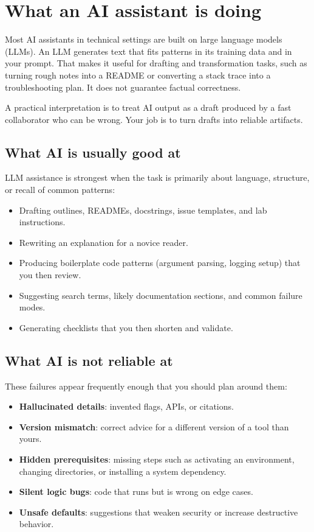 \section{What an AI assistant is doing}
Most AI assistants in technical settings are built on large language models (LLMs). An LLM generates text that fits patterns in its training data and in your prompt. That makes it useful for drafting and transformation tasks, such as turning rough notes into a README or converting a stack trace into a troubleshooting plan. It does not guarantee factual correctness.

A practical interpretation is to treat AI output as a draft produced by a fast collaborator who can be wrong. Your job is to turn drafts into reliable artifacts.

\subsection{What AI is usually good at}
LLM assistance is strongest when the task is primarily about language, structure, or recall of common patterns:
\begin{itemize}[noitemsep]
  \item Drafting outlines, READMEs, docstrings, issue templates, and lab instructions.
  \item Rewriting an explanation for a novice reader.
  \item Producing boilerplate code patterns (argument parsing, logging setup) that you then review.
  \item Suggesting search terms, likely documentation sections, and common failure modes.
  \item Generating checklists that you then shorten and validate.
\end{itemize}

\subsection{What AI is not reliable at}
These failures appear frequently enough that you should plan around them:
\begin{itemize}[noitemsep]
  \item \textbf{Hallucinated details}: invented flags, APIs, or citations.
  \item \textbf{Version mismatch}: correct advice for a different version of a tool than yours.
  \item \textbf{Hidden prerequisites}: missing steps such as activating an environment, changing directories, or installing a system dependency.
  \item \textbf{Silent logic bugs}: code that runs but is wrong on edge cases.
  \item \textbf{Unsafe defaults}: suggestions that weaken security or increase destructive behavior.
\end{itemize}

